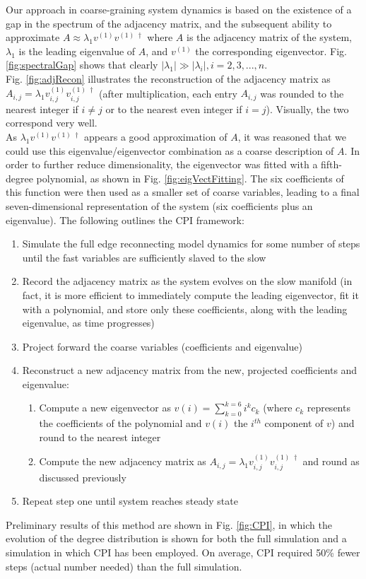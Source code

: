 \documentclass[11pt]{article}
\begin{document}
Our approach in coarse-graining system dynamics is based on the existence of a gap in the spectrum of the adjacency matrix, and the subsequent ability to approximate $A\approx \lambda_{1}v^{(1)}v^{(1) \;\dagger}$ where $A$ is the adjacency matrix of the system, $\lambda_{1}$ is the leading eigenvalue of $A$, and $v^{(1)}$ the corresponding eigenvector. Fig. \ref{fig:spectralGap} shows that clearly $|\lambda_{1}| \gg |\lambda_{i}|, i=2,3,...,n$. \\
Fig. \ref{fig:adjRecon} illustrates the reconstruction of the adjacency matrix as $A_{i,j}=\lambda_{1}v^{(1)}_{i,j}v^{(1) \;\dagger}_{i,j}$ (after multiplication, each entry $A_{i,j}$ was rounded to the nearest integer if $i\neq j$ or to the nearest even integer if $i=j$). Visually, the two correspond very well. \\
As $\lambda_{1}v^{(1)}v^{(1) \;\dagger}$ appears a good approximation of $A$, it was reasoned that we could use this eigenvalue/eigenvector combination as a coarse description of $A$. In order to further reduce dimensionality, the eigenvector was fitted with a fifth-degree polynomial, as shown in Fig. \ref{fig:eigVectFitting}. The six coefficients of this function were then used as a smaller set of coarse variables, leading to a final seven-dimensional representation of the system (six coefficients plus an eigenvalue). The following outlines the CPI framework:
\begin{enumerate}
\item Simulate the full edge reconnecting model dynamics for some number of steps until the fast variables are sufficiently slaved to the slow
\item Record the adjacency matrix as the system evolves on the slow manifold (in fact, it is more efficient to immediately compute the leading eigenvector, fit it with a polynomial, and store only these coefficients, along with the leading eigenvalue, as time progresses)
\item Project forward the coarse variables (coefficients and eigenvalue)
\item Reconstruct a new adjacency matrix from the new, projected coefficients and eigenvalue:
  \begin{enumerate}
  \item Compute a new eigenvector as $v(i) = \displaystyle\sum\limits_{k=0}^{k=6} i^{k}c_{k}$ (where $c_{k}$ represents the coefficients of the polynomial and $v(i)$ the $i^{th}$ component of $v$) and round to the nearest integer
  \item Compute the new adjacency matrix as $A_{i,j}=\lambda_{1}v^{(1)}_{i,j}v^{(1) \;\dagger}_{i,j}$ and round as discussed previously
  \end{enumerate}
\item Repeat step one until system reaches steady state
\end{enumerate}
Preliminary results of this method are shown in Fig. \ref{fig:CPI}, in which the evolution of the degree distribution is shown for both the full simulation and a simulation in which CPI has been employed. On average, CPI required 50\% fewer steps (actual number needed) than the full simulation.
\end{document}

